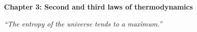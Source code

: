 \renewcommand{\theequation}{3.\arabic{equation}}

\begin{frame}
\begin{center}
{\bf Chapter 3: Second and third laws of thermodynamics}\\
\end{center}

\scriptsize

\vspace*{3cm}

\begin{center}
\textit{``The entropy of the universe tends to a maximum.''}
\end{center}

\end{frame}

\scriptsize










